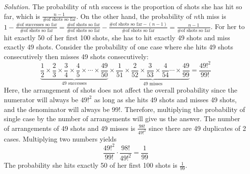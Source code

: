 \documentclass[12pt, oneside]{article}
\begin{document}
\emph{Solution.} The probability of $n$th success is the proportion of shots she has hit so far, which is $\frac{n - 1}{\text{\# of shots so far}}$. On the other hand, the probability of $n$th miss is $1 - \frac{\text{\# of successes so far}}{\text{\# of shots so far}} = \frac{\text{\# of shots so far}}{\text{\# of shots so far}} - \frac{\text{\# of shots so far} - (n - 1)}{\text{\# of shots so far}} = \frac{n-1}{\text{\# of shots so far}}$. For her to hit exactly 50 of her first 100 shots, she has to hit exactly 49 shots and miss exactly 49 shots. Consider the probability of one case where she hits 49 shots consecutively then misses 49 shots consecutively: 
\[
\underbrace{\frac{1}{2} \times \frac{2}{3} \times \frac{3}{4} \times \frac{4}{5} \times \cdots \times \frac{49}{50}}_\text{49 successes} \times \underbrace{\frac{1}{51} \times \frac{2}{52} \times \frac{3}{53} \times \frac{4}{54} \cdots \times \frac{49}{99}}_\text{49 misses} = \frac{49!^2}{99!}
\]
Here, the arrangement of shots does not affect the overall probability since the numerator will always be $49!^2$ as long as she hits 49 shots and misses 49 shots, and the denominator will always be 99!. Therefore, multiplying the probability of single case by the number of arrangements will give us the answer. The number of arrangements of 49 shots and 49 misses is $\frac{98!}{49!^2}$ since there are 49 duplicates of 2 cases. Multiplying two numbers yields
\[
\frac{49!^2}{99!} \cdot \frac{98!}{49!^2} = \frac{1}{99}
\]
The probability she hits exactly 50 of her first 100 shots is $\frac{1}{99}$.
\pagebreak
\end{document}
